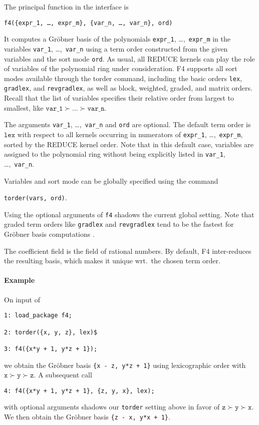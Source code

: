 \documentclass{article}
\newcommand{\grobner}{Gr\"obner}
\newcommand{\code}[1]{\texttt{#1}}
\begin{document}
The principal function in the interface is
%
\begin{center}
    \code{f4(\{expr\_1, \ldots, expr\_m\}, \{var\_n, \ldots, var\_n\}, ord)}
\end{center}
%
It computes a \grobner{} basis of the polynomials \code {expr\_1}, \dots,~\code{expr\_m} in the variables 
\code{var\_1}, \dots,~\code{var\_n} using a
term order constructed from the given variables and the sort mode \code{ord}. As usual, all REDUCE
kernels can play the role of variables of the polynomial ring under consideration. F4 supports all sort modes
available through the torder command, including the basic orders \code{lex}, 
\code{gradlex}, and \code{revgradlex}, as well as block, weighted, graded, and matrix orders. 
Recall that the list of variables
specifies their relative order from largest to smallest, like $\code{var\_1} \succ \dots \succ
\code{var\_n}$.

The arguments \code{var\_1}, \dots,~\code{var\_n} and \code{ord} are optional. The default term
order is $\code{lex}$ with respect to all kernels occurring in numerators of \code{expr\_1},
\dots,~\code{expr\_m}, sorted by the REDUCE kernel order. Note that in this default case, variables
are assigned to the polynomial ring without being explicitly listed in \code{var\_1},
\dots,~\code{var\_n}.

Variables and sort mode can be globally specified using the command
%
\begin{center}
    \code{torder(vars, ord)}.
\end{center}
%
Using the optional arguments of \code{f4} shadows the current global
setting. Note that graded term orders like
\code{gradlex} and \code{revgradlex} tend to be the fastest for \grobner{}
basis computations \cite[\S5]{tolstaya}.

The coefficient field is the field of rational numbers. 
By default, F4 inter-reduces the resulting basis, which makes it unique wrt.~the chosen term order.
%
\paragraph{Example}
On input of
\begin{verbatim}
1: load_package f4;

2: torder({x, y, z}, lex)$

3: f4({x*y + 1, y*z + 1});
\end{verbatim}
we obtain the \grobner{} basis
\code{\{x - z, y*z + 1\}} using lexicographic order with $\code{x} \succ
\code{y} \succ \code{z}$. A subsequent call
\begin{verbatim}
4: f4({x*y + 1, y*z + 1}, {z, y, x}, lex);
\end{verbatim}
with optional arguments shadows our \code{torder} setting above in favor of $
\code{z}
\succ \code{y} \succ \code{x}$. We then obtain the \grobner{} basis
\code{\{z - x, y*x + 1\}}.
%
\end{document}
